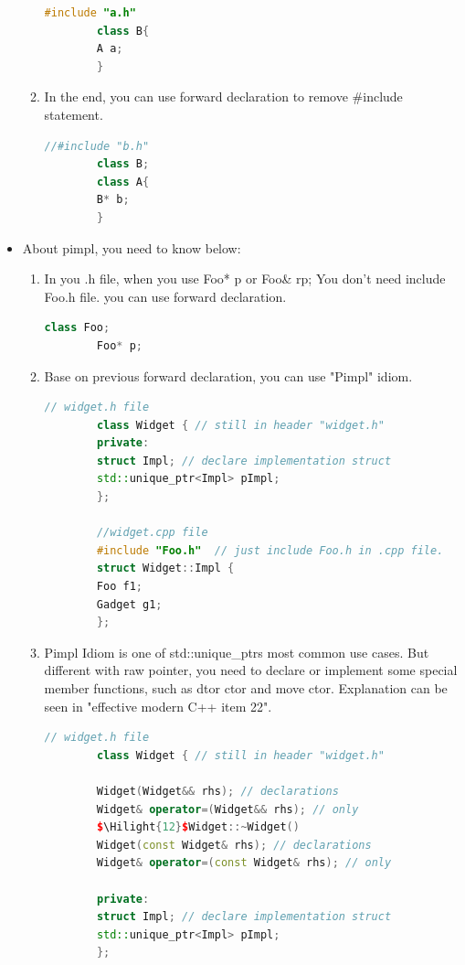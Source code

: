 \documentclass[a4paper,12pt,twoside]{book}
\newcommand{\Hilight}[1]{\makebox[0pt][l]{\color{yellow}\rule[-3pt]{#1em}{11pt}}}
\begin{document}
\begin{itemize}
\begin{enumerate}
\begin{lstlisting}[frame=single, language=c++]
		#include "a.h"
		class B{
		A a;
		}
		\end{lstlisting}
		\item In the end, you can use forward declaration to remove \#include statement. 
		\begin{lstlisting}[frame=single, language=c++]
		//#include "b.h"
		class B;
		class A{
		B* b;
		}
		\end{lstlisting}
	\end{enumerate}
	
	\item About pimpl, you need to know below:
	
	\begin{enumerate}
		
		\item In you .h file, when you use Foo* p or Foo\& rp; You don't need include Foo.h file. you can use forward declaration.
		\begin{lstlisting}[frame=single, language=c++]
		class Foo;
		Foo* p;
		\end{lstlisting}
		
		\item Base on previous forward declaration, you can use "Pimpl" idiom.
		\begin{lstlisting}[frame=single, language=c++]
		// widget.h file
		class Widget { // still in header "widget.h"
		private:
		struct Impl; // declare implementation struct
		std::unique_ptr<Impl> pImpl;
		};
		
		//widget.cpp file
		#include "Foo.h"  // just include Foo.h in .cpp file.
		struct Widget::Impl {
		Foo f1;
		Gadget g1;
		};
		\end{lstlisting}
		
		\item Pimpl Idiom is one of std::unique\_ptrs most common use cases. But different with raw pointer,  you need to declare or implement some special member functions, such as dtor ctor and move ctor. Explanation can be seen in "effective modern C++ item 22". 
		\begin{lstlisting}[frame=single, language=c++, mathescape=true]
		// widget.h file
		class Widget { // still in header "widget.h"
		
		Widget(Widget&& rhs); // declarations
		Widget& operator=(Widget&& rhs); // only
		$\Hilight{12}$Widget::~Widget()
		Widget(const Widget& rhs); // declarations
		Widget& operator=(const Widget& rhs); // only
		
		private:
		struct Impl; // declare implementation struct
		std::unique_ptr<Impl> pImpl;
		};
		

\end{lstlisting}
\end{enumerate}
\end{itemize}
\end{document}
